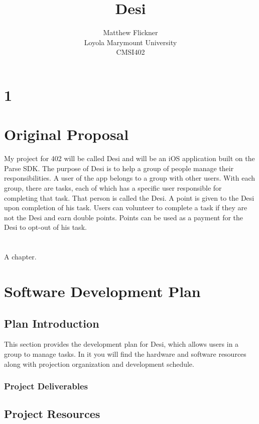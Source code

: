\documentclass[11pt, a4paper]{report}
\title{Desi}
\author{Matthew Flickner \\ Loyola Marymount University\\ CMSI402}
\providecommand\phantomsection{}
\begin{document}
\clearpage
\phantomsection
{}
\maketitle


\tableofcontents
\newpage
 
\chapter{1}

\chapter{Original Proposal}
My project for 402 will be called Desi and will be an iOS application built on the Parse SDK. The purpose of Desi is to help a group of people manage their responsibilities. A user of the app belongs to a group with other users. With each group, there are tasks, each of which has a specific user responsible for completing that task. That person is called the Desi. A point is given to the Desi upon completion of his task. Users can volunteer to complete a task if they are not the Desi and earn double points. Points can be used as a payment for the Desi to opt-out of his task.

\chapter{}
 A chapter.

\chapter{Software Development Plan}
\section{Plan Introduction}
This section provides the development plan for Desi, which allows users in a group to manage tasks. In it you will find the hardware and software resources along with projection organization and development schedule.
\subsection{Project Deliverables}

\section{Project Resources}
\end{document}
